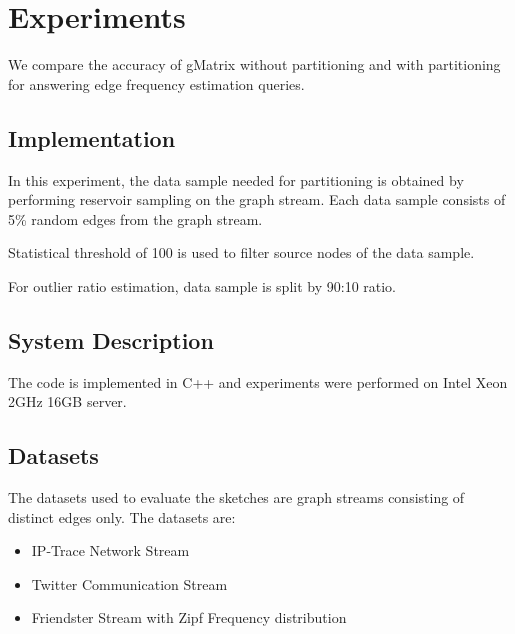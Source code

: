 \chapter{Experiments}

\ifpdf
    \graphicspath{{Chapter3/Figs/Raster/}{Chapter3/Figs/PDF/}{Chapter3/Figs/}}
\else
    \graphicspath{{Chapter3/Figs/Vector/}{Chapter3/Figs/}}
\fi

We compare the accuracy of gMatrix without partitioning and with partitioning for answering edge frequency estimation queries.

\section{Implementation}
In this experiment, the data sample needed for partitioning is obtained by performing reservoir sampling\cite{DBLP} on the graph stream. Each data sample consists of 5\% random edges from the graph stream.

Statistical threshold of 100 is used to filter source nodes of the data sample.

For outlier ratio estimation, data sample is split by 90:10 ratio.

\section{System Description}
The code is implemented in C++ and experiments were performed on Intel Xeon 2GHz 16GB server.

\section{Datasets}
The datasets used to evaluate the sketches are graph streams consisting of distinct edges only. The datasets are:
\begin{itemize}
\item IP-Trace Network Stream \cite{khan}
\item Twitter Communication Stream \cite{khan}
\item Friendster Stream with Zipf Frequency distribution \cite{khan}
\end{itemize}


